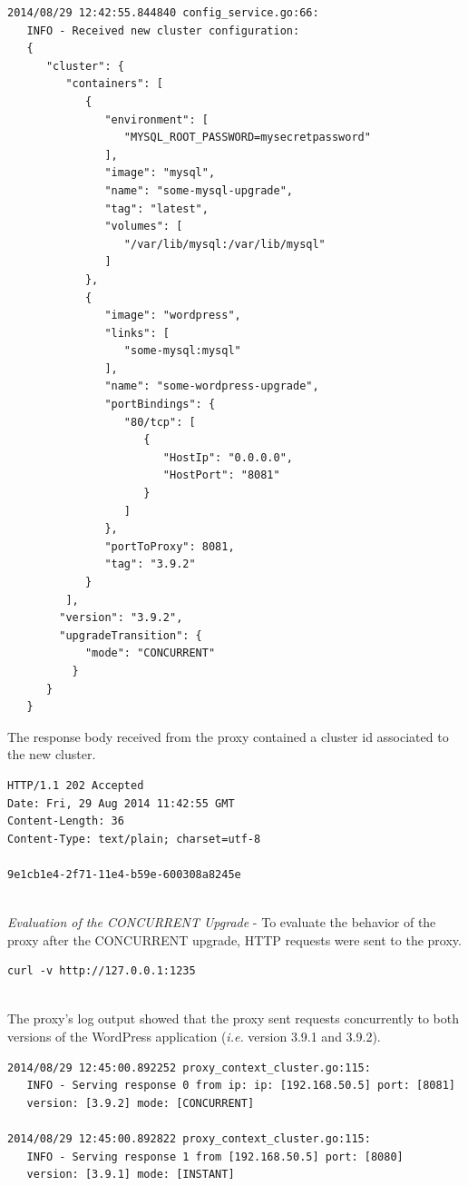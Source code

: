 \documentclass[a4paper,11pt,twoside]{report}
\begin{document}
\begin{lstlisting}[language=terminal]
2014/08/29 12:42:55.844840 config_service.go:66:     
   INFO - Received new cluster configuration:
   {
      "cluster": {
         "containers": [
            {
               "environment": [
                  "MYSQL_ROOT_PASSWORD=mysecretpassword"
               ],
               "image": "mysql",
               "name": "some-mysql-upgrade",
               "tag": "latest",
               "volumes": [
                  "/var/lib/mysql:/var/lib/mysql"
               ]
            },
            {
               "image": "wordpress",
               "links": [
                  "some-mysql:mysql"
               ],
               "name": "some-wordpress-upgrade",
               "portBindings": {
                  "80/tcp": [
                     {
                        "HostIp": "0.0.0.0",
                        "HostPort": "8081"
                     }
                  ]
               },
               "portToProxy": 8081,
               "tag": "3.9.2"
            }
         ],
        "version": "3.9.2", 
        "upgradeTransition": {
            "mode": "CONCURRENT"
          }
      }
   } 
\end{lstlisting} 

\noindent
The response body received from the proxy contained a cluster id associated to the new cluster.\smallskip

\begin{lstlisting}[language=terminal]
HTTP/1.1 202 Accepted
Date: Fri, 29 Aug 2014 11:42:55 GMT
Content-Length: 36
Content-Type: text/plain; charset=utf-8

9e1cb1e4-2f71-11e4-b59e-600308a8245e
\end{lstlisting} 

\noindent\\
\textit{Evaluation of the CONCURRENT Upgrade} - To evaluate the behavior of the proxy after the CONCURRENT upgrade, HTTP requests were sent to the proxy. \smallskip

\begin{lstlisting}[language=terminal]
curl -v http://127.0.0.1:1235
\end{lstlisting}

\noindent\\ 
The proxy's log output showed that the proxy sent requests concurrently to both versions of the WordPress application (\textit{i.e.} version 3.9.1 and 3.9.2). \smallskip 

\begin{lstlisting}[language=terminal]
2014/08/29 12:45:00.892252 proxy_context_cluster.go:115:     
   INFO - Serving response 0 from ip: ip: [192.168.50.5] port: [8081] 
   version: [3.9.2] mode: [CONCURRENT]

2014/08/29 12:45:00.892822 proxy_context_cluster.go:115:     
   INFO - Serving response 1 from [192.168.50.5] port: [8080] 
   version: [3.9.1] mode: [INSTANT]
\end{lstlisting}
\end{document}
